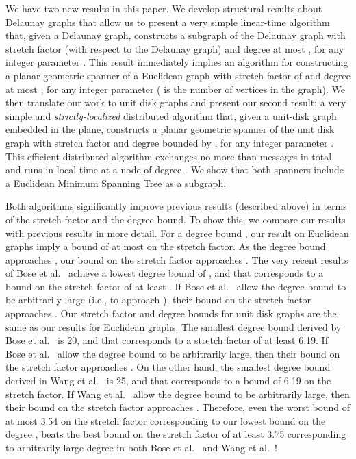 \documentclass{stacs_proc}
\theoremstyle{plain}\newtheorem{satz}[thm]{Satz}
\begin{document}
We have two new results in this paper. We develop structural results about
Delaunay graphs that allow us to present a very simple linear-time algorithm
that, given a Delaunay graph, constructs a subgraph of the Delaunay graph
with stretch factor  (with respect
to the Delaunay graph) and degree at most , for any integer
parameter . This result immediately implies an 
algorithm for constructing a planar geometric spanner of a Euclidean graph
with stretch factor of  and degree at most , for any integer parameter  ( is the number of vertices in the graph). We then translate our
work to unit disk graphs and present our second result: a
very simple and {\em strictly-localized} distributed algorithm that, given a
unit-disk graph embedded in the plane, constructs a planar geometric spanner
of the unit disk graph with stretch factor  and degree bounded by , for
any integer parameter . This efficient distributed algorithm
exchanges no more than  messages in total, and runs in  local time at a node of degree . We show that both
spanners include a Euclidean Minimum Spanning Tree as a subgraph.

Both algorithms significantly improve previous results (described above)
in terms of the stretch factor and the degree bound. To show this, we compare
our results with previous results in more detail. For a degree bound ,
our result on Euclidean graphs imply a bound of at most  on the stretch
factor. As the degree bound  approaches , our bound on the
stretch factor approaches . The very recent
results of Bose et al.~\cite{bose1} achieve a lowest degree bound of
, and that corresponds to a bound on the stretch factor of at
least . If Bose et al.~\cite{bose1} allow the degree bound to be
arbitrarily large (i.e., to approach ), their bound on the
stretch factor approaches . Our stretch factor
and degree bounds for unit disk graphs are the same as our results
for Euclidean graphs. The smallest
degree bound derived by Bose et al.~\cite{bose1} is 20, and that
corresponds to a stretch factor of at least 6.19. If Bose et
al.~\cite{bose1} allow the degree bound to be arbitrarily large,
then their bound on the stretch factor approaches . On the other hand, the smallest degree bound derived in
Wang et al.~\cite{iitbounded1,iitbounded} is 25, and that
corresponds to a bound of 6.19 on the stretch factor. If Wang et
al.~\cite{iitbounded1,iitbounded} allow the degree bound to be
arbitrarily large, then their bound on the stretch factor approaches
. Therefore, even the worst bound of
at most 3.54 on the stretch factor corresponding to our lowest bound
on the degree , beats the best bound on the stretch factor of
at least 3.75 corresponding to arbitrarily large degree in both Bose
et al.~\cite{bose1} and Wang et al.~\cite{iitbounded1,iitbounded}!
\end{document}

